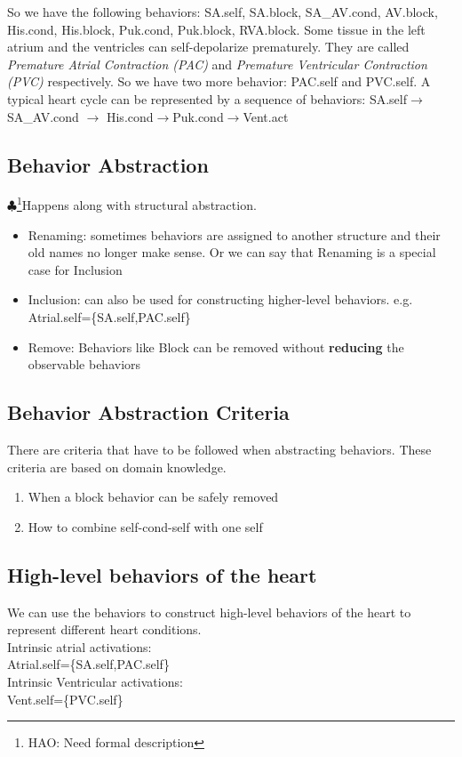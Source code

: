 \documentclass{llncs}
\newcommand{\Hao}[1]{$\clubsuit$\footnote{HAO: #1}}
\begin{document}
So we have the following behaviors: \textsf{SA.self}, \textsf{SA.block},  \textsf{SA\_AV.cond}, \textsf{AV.block}, \textsf{His.cond}, \textsf{His.block}, \textsf{Puk.cond}, \textsf{Puk.block}, \textsf{RVA.block}. Some tissue in the left atrium and the ventricles can self-depolarize prematurely. They are called \emph{Premature Atrial Contraction (PAC)} and \emph{Premature Ventricular Contraction (PVC)} respectively. So we have two more behavior: \textsf{PAC.self} and \textsf{PVC.self}. A typical heart cycle can be represented by a sequence of behaviors: \textsf{SA.self$\rightarrow$SA\_AV.cond $\rightarrow$ His.cond$\rightarrow$Puk.cond$\rightarrow$Vent.act}

\subsection{Behavior Abstraction}
\Hao{Need formal description}Happens along with structural abstraction.
\begin{itemize}
	\item Renaming: sometimes behaviors are assigned to another structure and their old names no longer make sense. Or we can say that Renaming is a special case for Inclusion
    \item Inclusion: can also be used for constructing higher-level behaviors. e.g. \textsf{Atrial.self=\{SA.self,PAC.self\}}
    \item Remove: Behaviors like Block can be removed without \textbf{reducing} the observable behaviors
\end{itemize}
\subsection{Behavior Abstraction Criteria}
There are criteria that have to be followed when abstracting behaviors. These criteria are based on domain knowledge.
\begin{enumerate}
	\item When a \textsf{block} behavior can be safely removed
    \item How to combine \textsf{self-cond-self} with one \textsf{self}
\end{enumerate}
\subsection{High-level behaviors of the heart}
We can use the behaviors to construct high-level behaviors of the heart to represent different heart conditions.\\
Intrinsic atrial activations:\\
\textsf{Atrial.self=\{SA.self,PAC.self\}}\\
Intrinsic Ventricular activations:\\
\textsf{Vent.self=\{PVC.self\}}
\end{document}
